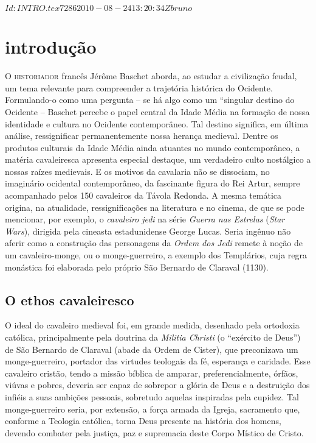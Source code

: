\SVN $Id: INTRO.tex 7286 2010-08-24 13:20:34Z bruno $
\chapter[Introdução, por Marcus Baccega]{introdução}

\textsc{O historiador} francês Jérôme Baschet aborda, ao estudar a civilização
feudal, um tema relevante para compreender a trajetória histórica do Ocidente.
Formulando-o como uma pergunta -- se há algo como um “singular destino do
Ocidente -- Baschet percebe o papel central da Idade Média na formação de nossa
identidade e cultura no Ocidente contemporâneo. Tal destino significa, em
última análise, ressignificar permanentemente nossa herança medieval. Dentre os
produtos culturais da Idade Média ainda atuantes no mundo contemporâneo, a
matéria cavaleiresca apresenta especial destaque, um verdadeiro culto
nostálgico a nossas raízes medievais. E os motivos da cavalaria não se
dissociam, no imaginário ocidental contemporâneo, da fascinante figura do Rei
Artur, sempre acompanhado pelos 150 cavaleiros da Távola Redonda. A mesma
temática origina, na atualidade, ressignificações na literatura e no cinema, de
que se pode mencionar, por exemplo, o \textit{cavaleiro} \textit{jedi} na série
\textit{Guerra nas Estrelas} (\textit{Star Wars}), dirigida pela cineasta
estadunidense George Lucas. Seria ingênuo não aferir como a construção das
personagens da \textit{Ordem dos Jedi} remete à noção de um cavaleiro-monge, ou
o monge-guerreiro, a exemplo dos Templários, cuja regra monástica foi elaborada
pelo próprio São Bernardo de Claraval (1130). 

\section{O ethos cavaleiresco}

O ideal do cavaleiro medieval foi, em grande medida, desenhado pela
ortodoxia católica, principalmente pela doutrina da \textit{Militia Christi} (o
“exército de Deus”) de São Bernardo de Claraval (abade da Ordem de Cister), que
preconizava um monge-guerreiro, portador das virtudes teologais da fé,
esperança e caridade. Esse cavaleiro cristão, tendo a missão bíblica de
amparar, preferencialmente, órfãos, viúvas e pobres, deveria ser capaz de
sobrepor a glória de Deus e a destruição dos infiéis a suas ambições pessoais,
sobretudo aquelas inspiradas pela cupidez. Tal monge-guerreiro seria, por
extensão, a força armada da Igreja, sacramento que, conforme a Teologia
católica, torna Deus presente na história dos homens, devendo combater pela
justiça, paz e supremacia deste Corpo Místico de Cristo. 

